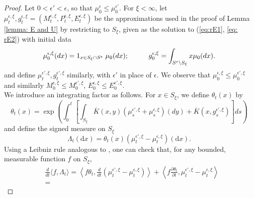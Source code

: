 \documentclass[11pt, notitlepage]{article}
\newcommand{\dd}{\ensuremath{\mathrm{d}}}
\begin{document}
\begin{proof} Let $0<\epsilon'<\epsilon$, so that $\mu_0^\epsilon\le\mu_0^{\epsilon'}.$ For $\xi<\infty$, let $\mu^{\epsilon, \xi}_t, g^{\epsilon, \xi}_t=(M^{\epsilon,\xi}_t,P^{\epsilon,\xi}_t,E^{\epsilon,\xi}_t)$ be the approximations used in the proof of Lemma \ref{lemma: E and U} by restricting to $S_\xi$, given as the solution to (\ref{eq:rE1}, \ref{eq: rE2}) with initial data
\begin{equation} \mu^{\epsilon,\xi}_0(dx)=1_{x\in S_\xi \cap S^\epsilon}\hspace{0.1cm}\mu_0(dx);\hspace{1cm} g^{\epsilon,\xi}_0=\int_{S^\epsilon\setminus S_\xi}x\mu_0(dx).\end{equation}
and define $\mu^{\epsilon',\xi}_t, g^{\epsilon',\xi}_t$ similarly, with $\epsilon'$ in place of $\epsilon$. We observe that $\mu^{\epsilon,\xi}_0\le \mu^{\epsilon',\xi}_0$ and similarly $M^{\epsilon,\xi}_0\le M^{\epsilon',\xi}_0$, $E^{\epsilon,\xi}_0\le E^{\epsilon',\xi}_0$. \medskip \\ 
We introduce an integrating factor as follows. For $x\in S_\xi$, we define $\theta_t(x)$ by 
\begin{equation} \theta_t(x)=\exp\left( \int_0^t\left[\int_{S_\xi}\overline{K}(x,y) (\mu^{\epsilon',\xi}_s+\mu^{\epsilon,\xi}_s)(d y)+\overline{K}\left(x,g^{\epsilon',\xi}_s\right)\right]ds\right)
\end{equation}
and define the signed measure on $S_\xi$ \begin{equation}
    \Lambda_t(\dd x) = \theta_t(x) \left(\mu^{\epsilon',\xi}_t - \mu^{\epsilon,\xi}_t\right)(\dd x).
\end{equation} Using a Leibniz rule analogous to \cite[Proposition 2.5]{N00}, one can check that, for any bounded, measurable function $f$ on $S_\xi$, \begin{equation} \label{eq: ODE for xit} \begin{split} &\frac{d}{dt}\langle f, \Lambda_t\rangle = \left\langle f \theta_t, \frac{d}{dt}(\mu^{\epsilon',\xi}_t-\mu^{\epsilon, \xi}_t)\right\rangle +\left\langle f\frac{\partial \theta_t}{\partial t},\mu^{\epsilon',\xi}_t-\mu^{\epsilon, \xi}_t  \right\rangle \\[1ex]& = %

\end{split}
\end{equation}
\end{proof}
\end{document}
